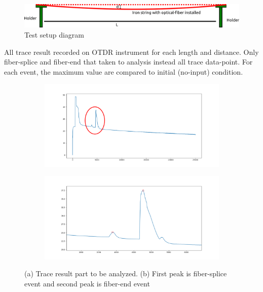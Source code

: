 \documentclass[a4paper,14pt]{article}
\begin{document}
\begin{figure}[h!]
	\centering
	\captionsetup{justification=centering}
	\includegraphics[width=0.6\linewidth]{images/setup}
	\caption[Setup Diagram]{\small{Test setup diagram}}
\end{figure}

All trace result recorded on OTDR instrument for each length and distance.
Only fiber-splice and fiber-end that taken to analysis instead all trace data-point.
For each event, the maximum value are compared to initial (no-input) condition.

\begin{figure}[h!]
	\centering
	\captionsetup{justification=centering}
	\begin{subfigure}[b]{0.4\textwidth}
		\includegraphics[width=\textwidth]{images/base}
		\caption{}
	\end{subfigure}
	\begin{subfigure}[b]{0.4\textwidth}
		\includegraphics[width=\textwidth]{images/take_point}
		\caption{}
	\end{subfigure}
	\caption[Setup Diagram]{\small{(a) Trace result part to be analyzed. (b) First peak is fiber-splice event and second peak is fiber-end event}}
\end{figure}
\end{document}
